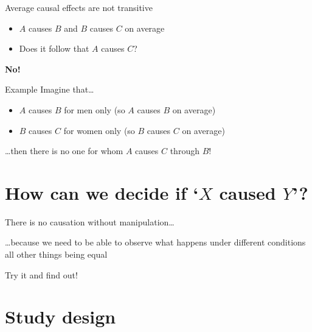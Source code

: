 \begin{frame}{Average causal effects are not transitive}
    \begin{itemize}
        \item $A$ causes $B$ and $B$ causes $C$ \alert{on average}
        \item Does it follow that $A$ causes $C$?
    \end{itemize}
    \vfill\pause
    \begin{center}
        \LARGE%
        \textbf{No!}
    \end{center}
    \begin{block}{Example}
        Imagine that\ldots\vspace{-1ex}
        \begin{itemize}
            \item $A$ causes $B$ for men only (so $A$ causes $B$ on average)
            \item $B$ causes $C$ for women only (so $B$ causes $C$ on average)
        \end{itemize}\vspace{-1ex}
        \ldots then there is no one for whom $A$ causes $C$ through $B$!
    \end{block}
\end{frame}

\section[How can we decide if \\ `$X$ caused $Y$'?]%
        {How can we decide if `$X$ caused $Y$'?}

\begin{frame}{There is no causation without manipulation\ldots}
    \begin{center}
        \large%
        \ldots because we need to be able to observe what happens under
        different conditions \alert{all other things being equal}
    \end{center}
    \vfill\pause
    \begin{center}
        \LARGE%
        Try it and find out!
    \end{center}
\end{frame}

\section{Study design}

